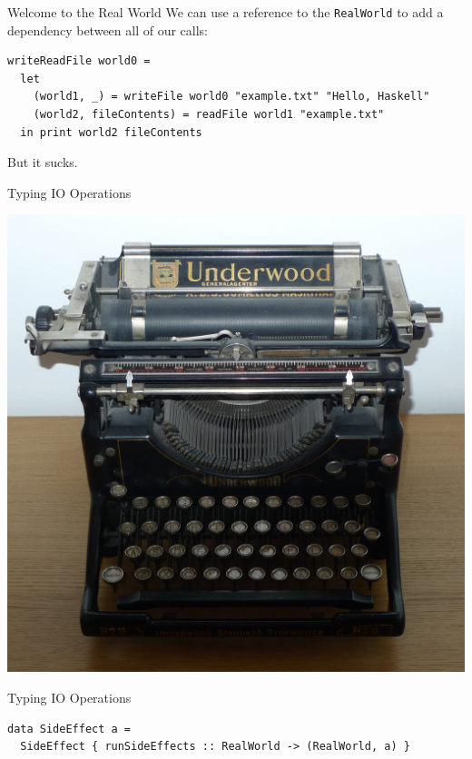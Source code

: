 \documentclass[10pt, presentation, colorlinks]{beamer}
\begin{document}
\begin{frame}[label={sec:orgdde7f36},fragile]{Welcome to the Real World}
 We can use a reference to the \texttt{RealWorld} to add a dependency between all of our calls:

\bigskip
\pause

\begin{verbatim}
writeReadFile world0 =
  let
    (world1, _) = writeFile world0 "example.txt" "Hello, Haskell"
    (world2, fileContents) = readFile world1 "example.txt"
  in print world2 fileContents
\end{verbatim}

\bigskip
\pause

But it sucks.
\end{frame}

\begin{frame}[label={sec:org680dcbd}]{Typing IO Operations}
\begin{center}
\includegraphics[height=0.4\textheight]{./img/typewriter.JPG}
\end{center}
\end{frame}

\begin{frame}[label={sec:org3cadfe6},fragile]{Typing IO Operations}
 \begin{verbatim}
data SideEffect a =
  SideEffect { runSideEffects :: RealWorld -> (RealWorld, a) }
\end{verbatim}
\end{frame}
\end{document}
